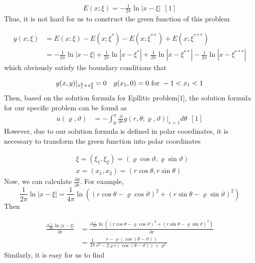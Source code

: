 \documentclass[a4paper,12pt]{article}
\begin{document}
\begin{equation*}
\begin{aligned}
E(x;\xi) =  - \frac{1}{2\pi} \ln|x - \xi| \ \ [1]
\end{aligned}
\end{equation*}
Thus, it is not hard for us to construct the green function of this problem 

\begin{equation*}
\begin{aligned}
g(x;\xi) &= E(x;\xi) - E(x;\xi^*) - E(x;\xi^{**}) + E(x;\xi^{***})\\
&=- \frac{1}{2\pi} \ln|x - \xi| + \frac{1}{2\pi} \ln|x - \xi^*| + \frac{1}{2\pi} \ln|x - \xi^{**}| - \frac{1}{2\pi} \ln|x - \xi^{***}|
\end{aligned}
\end{equation*}
which obviously satisfy the boundary conditions that 

\begin{equation*}
\begin{aligned}
&g(x,y)|_{x_1^2 + x_2^2} = 0 & g(x_1,0) = 0 \ {\rm for} \  -1 < x_1 <1
\end{aligned}
\end{equation*}
Then, based on the solution formula for Epllitic problem[1], the solution formula for our specific problem can be found as
\begin{equation*}
\begin{aligned}
u(\varrho, \vartheta) &= - \int_{0}^{\pi} \frac{\partial }{\partial r}g(r, \theta;\varrho, \vartheta)|_{r= 1} d \theta \ \ [1]
\end{aligned}
\end{equation*}
However, due to our solution formula is defined in polar coordinates, it is necessary to transform the green function into polar coordinates

\begin{equation*}
\begin{aligned}
&\xi  =(\xi_1,\xi_2) = (\varrho \cos\vartheta, \varrho\sin\vartheta)\\
&x = (x_1,x_2) = (r\cos\theta,r\sin\theta)
\end{aligned}
\end{equation*}
Now, we can calculate $\frac{\partial g}{\partial r}$. For example, 
$$
\frac{1}{2\pi} \ln|x - \xi| = \frac{1}{4\pi}\ln((r\cos\theta - \varrho\cos\vartheta)^2+ (r\sin\theta - \varrho\sin\vartheta)^2)
$$ 
Then 

\begin{equation*}
\begin{aligned}
\frac{\partial \frac{1}{2\pi} \ln|x - \xi|}{\partial r} &= \frac{\partial \frac{1}{4\pi}\ln((r\cos\theta - \varrho\cos\vartheta)^2+ (r\sin\theta - \varrho\sin\vartheta)^2)}{\partial r}\\
&= \frac{1}{2\pi} \frac{r - \varrho(\cos(\theta - \vartheta))}{r^2 - 2\varrho r(\cos(\theta - \vartheta)) + \varrho^2}
\end{aligned}
\end{equation*}
Similarly, it is easy for us to find
\end{document}
